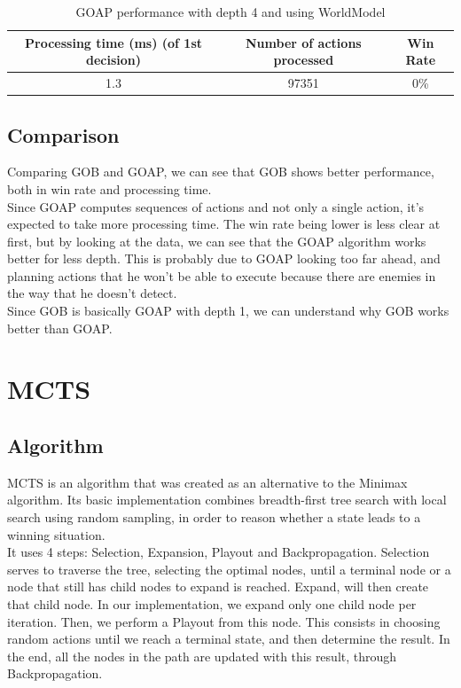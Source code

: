 \documentclass{article}
\begin{document}
  \begin{table}[h!]
    \centering
    \caption{GOAP performance with depth 4 and using WorldModel}
    \label{tab:tableGOAP6}
    \begin{tabular}{c|c|c}
      \textbf{Processing time (ms) (of 1st decision)} & \textbf{Number of actions processed} & \textbf{Win Rate}\\
      \hline
      1.3 & 97351 & 0\%
    \end{tabular}
  \end{table}
  \subsection{Comparison}
  Comparing GOB and GOAP, we can see that GOB shows better performance, both in win rate and processing time. \\
  Since GOAP computes sequences of actions and not only a single action, it's expected to take more processing time. The win rate being lower is less clear at first, but
  by looking at the data, we can see that the GOAP algorithm works better for less depth. This is probably due to GOAP looking too far ahead, and planning actions 
  that he won't be able to execute because there are enemies in the way that he doesn't detect. \\
  Since GOB is basically GOAP with depth 1, we can understand why GOB works better than GOAP.
  
  \section{MCTS}
  \subsection{Algorithm}
  MCTS is an algorithm that was created as an alternative to the Minimax algorithm. Its basic implementation combines breadth-first tree search with local search using
  random sampling, in order to reason whether a state leads to a winning situation.\\
  It uses 4 steps: Selection, Expansion, Playout and Backpropagation. Selection serves to traverse the tree, selecting the optimal nodes, until a terminal node or a node that 
  still has child nodes to expand is reached. Expand, will then create that child node. In our implementation, we expand only one child node per iteration. Then, we perform 
  a Playout from this node. This consists in choosing random actions until we reach a terminal state, and then determine the result.
  In the end, all the nodes in the path are updated with this result, through Backpropagation.
  
\end{document}

